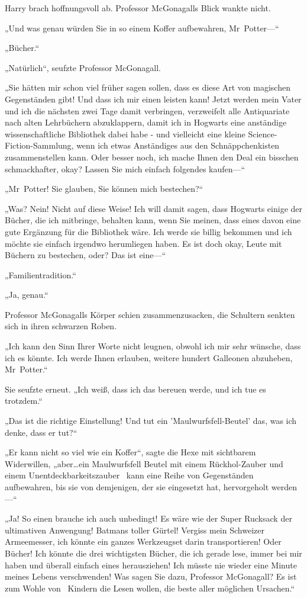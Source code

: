 {Harry brach hoffnungsvoll ab. Professor McGonagalls Blick wankte nicht.

„Und was genau würden Sie in so einem Koffer aufbewahren, Mr~Potter—“

„Bücher.“

„Natürlich“, seufzte Professor McGonagall.

„Sie hätten mir schon viel früher sagen sollen, dass es diese Art von magischen Gegenständen gibt! Und dass ich mir einen leisten kann! Jetzt werden mein Vater und ich die nächsten zwei Tage damit verbringen, verzweifelt alle Antiquariate nach alten Lehrbüchern abzuklappern, damit ich in Hogwarts eine anständige wissenschaftliche Bibliothek dabei habe - und vielleicht eine kleine Science-Fiction-Sammlung, wenn ich etwas Anständiges aus den Schnäppchenkisten zusammenstellen kann. Oder besser noch, ich mache Ihnen den Deal ein bisschen schmackhafter, okay? Lassen Sie mich einfach folgendes kaufen—“

„Mr~Potter! Sie glauben, Sie können mich bestechen?“

„Was? Nein! Nicht auf diese Weise! Ich will damit sagen, dass Hogwarts einige der Bücher, die ich mitbringe, behalten kann, wenn Sie meinen, dass eines davon eine gute Ergänzung für die Bibliothek wäre. Ich werde sie billig bekommen und ich möchte sie einfach irgendwo herumliegen haben. Es ist doch okay, Leute mit Büchern zu bestechen, oder? Das ist eine—“

„Familientradition.“

„Ja, genau.“

Professor McGonagalls Körper schien zusammenzusacken, die Schultern senkten sich in ihren schwarzen Roben.

„Ich kann den Sinn Ihrer Worte nicht leugnen, obwohl ich mir sehr wünsche, dass ich es könnte. Ich werde Ihnen erlauben, weitere hundert Galleonen abzuheben, Mr~Potter.“

Sie seufzte erneut. „Ich weiß, dass ich das bereuen werde, und ich tue es trotzdem.“

„Das ist die richtige Einstellung! Und tut ein 'Maulwurfsfell-Beutel' das, was ich denke, dass er tut?“

„Er kann nicht so viel wie ein Koffer“, sagte die Hexe mit sichtbarem Widerwillen, „aber…ein Maulwurfsfell Beutel mit einem Rückhol-Zauber und einem Unentdeckbarkeitszauber ~kann eine Reihe von Gegenständen aufbewahren, bis sie von demjenigen, der sie eingesetzt hat, hervorgeholt werden—“

„Ja! So einen brauche ich auch unbedingt! Es wäre wie der Super Rucksack der ultimativen Anwengung! Batmans toller Gürtel! Vergiss mein Schweizer Armeemesser, ich könnte ein ganzes Werkzeugset darin transportieren! Oder Bücher! Ich könnte die drei wichtigsten Bücher, die ich gerade lese, immer bei mir haben und überall einfach eines herausziehen! Ich müsste nie wieder eine Minute meines Lebens verschwenden! Was sagen Sie dazu, Professor McGonagall? Es ist zum Wohle von ~Kindern die Lesen wollen, die beste aller möglichen Ursachen.“

}
